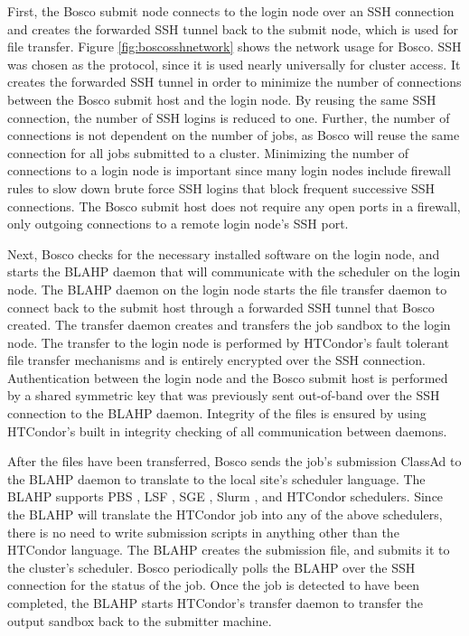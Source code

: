First, the Bosco submit node connects to the login node over an SSH connection and creates the forwarded SSH tunnel back to the submit node, which is used for file transfer.  Figure \ref{fig:boscosshnetwork} shows the network usage for Bosco.  SSH was chosen as the protocol, since it is used nearly universally for cluster access.  It creates the forwarded SSH tunnel in order to minimize the number of connections between the Bosco submit host and the login node.  By reusing the same SSH connection, the number of SSH logins is reduced to one.  Further, the number of connections is not dependent on the number of jobs, as Bosco will reuse the same connection for all jobs submitted to a cluster.  Minimizing the number of connections to a login node is important since many login nodes include firewall rules to slow down brute force SSH logins that block frequent successive SSH connections.  The Bosco submit host does not require any open ports in a firewall, only outgoing connections to a remote login node's SSH port.



Next, Bosco checks for the necessary installed software on the login node, and starts the BLAHP \cite{blahp} daemon that will communicate with the scheduler on the login node.  The BLAHP daemon on the login node starts the file transfer daemon to connect back to the submit host through a forwarded SSH tunnel that Bosco created.  The transfer daemon creates and transfers the job sandbox to the login node.  The transfer to the login node is performed by HTCondor's fault tolerant file transfer mechanisms and is entirely encrypted over the SSH connection.  Authentication between the login node and the Bosco submit host is performed by a shared symmetric key that was previously sent out-of-band over the SSH connection to the BLAHP daemon.  Integrity of the files is ensured by using HTCondor's built in integrity checking of all communication between daemons.

After the files have been transferred, Bosco sends the job's submission ClassAd \cite{raman1998matchmaking} to the BLAHP daemon to translate to the local site's scheduler language.  The BLAHP supports PBS \cite{computing2013torque}, LSF \cite{computinglsf}, SGE \cite{gentzsch2001sun}, Slurm \cite{yoo2003slurm}, and HTCondor schedulers.  Since the BLAHP will translate the HTCondor job into any of the above schedulers, there is no need to write submission scripts in anything other than the HTCondor language.  The BLAHP creates the submission file, and submits it to the cluster's scheduler.  Bosco periodically polls the BLAHP over the SSH connection for the status of the job.  Once the job is detected to have been completed, the BLAHP starts HTCondor's transfer daemon to transfer the output sandbox back to the submitter machine.

